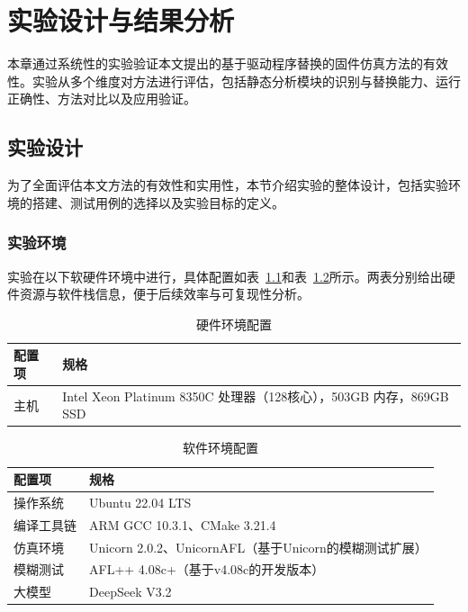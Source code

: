 \chapter{实验设计与结果分析}
\label{chap:experiment}

本章通过系统性的实验验证本文提出的基于驱动程序替换的固件仿真方法的有效性。实验从多个维度对方法进行评估，包括静态分析模块的识别与替换能力、运行正确性、方法对比以及应用验证。

\section{实验设计}
\label{sec:design}

为了全面评估本文方法的有效性和实用性，本节介绍实验的整体设计，包括实验环境的搭建、测试用例的选择以及实验目标的定义。

\subsection{实验环境}

实验在以下软硬件环境中进行，具体配置如表~\ref{tab:hw_env}和表~\ref{tab:sw_env}所示。两表分别给出硬件资源与软件栈信息，便于后续效率与可复现性分析。

\begin{table}[htbp]
\centering
\caption{硬件环境配置}
\label{tab:hw_env}
\footnotesize
\begin{tabular}{ll}
\toprule
\textbf{配置项} & \textbf{规格} \\
\midrule
主机 & Intel Xeon Platinum 8350C 处理器（128核心），503GB 内存，869GB SSD \\
\bottomrule
\end{tabular}
\end{table}

\begin{table}[htbp]
\centering
\caption{软件环境配置}
\label{tab:sw_env}
\footnotesize
\begin{tabular}{ll}
\toprule
\textbf{配置项} & \textbf{规格} \\
\midrule
操作系统 & Ubuntu 22.04 LTS \\
编译工具链 & ARM GCC 10.3.1、CMake 3.21.4 \\
仿真环境 & Unicorn 2.0.2、UnicornAFL（基于Unicorn的模糊测试扩展） \\
模糊测试 & AFL++ 4.08c+（基于v4.08c的开发版本） \\
大模型 & DeepSeek V3.2 \\
\bottomrule
\end{tabular}
\end{table}

